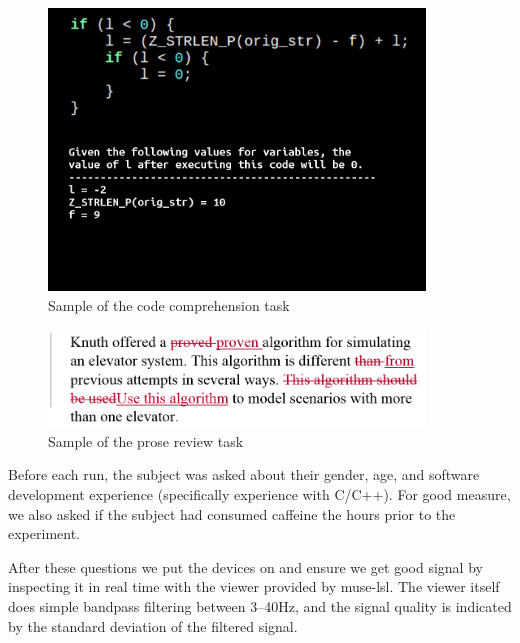             \begin{figure}
                \begin{center}
                    \includegraphics[trim=0 120 0 0,clip,width=100mm]{img/final-1-1.png}
                \end{center}
                \caption{Sample of the code comprehension task}\label{fig:codetask}
            \end{figure}

            \begin{figure}
                \begin{center}
                    \includegraphics[width=100mm]{img/bugs_1.PNG}
                \end{center}
                \caption{Sample of the prose review task}\label{fig:prosetask}
            \end{figure}

            Before each run, the subject was asked about their gender, age, and software development experience (specifically experience with C/C++). For good measure, we also asked if the subject had consumed caffeine the hours prior to the experiment.

            After these questions we put the devices on and ensure we get good signal by inspecting it in real time with the viewer provided by muse-lsl. The viewer itself does simple bandpass filtering between 3--40Hz, and the signal quality is indicated by the standard deviation of the filtered signal.

